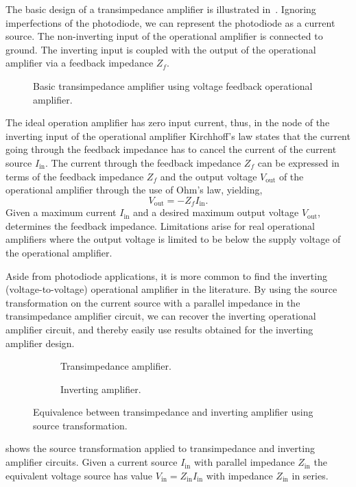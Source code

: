 The basic design of a transimpedance amplifier is illustrated in~.
Ignoring imperfections of the photodiode, we can represent the photodiode as a current source.
The non-inverting input of the operational amplifier is connected to ground.
The inverting input is coupled with the output of the operational amplifier via a feedback impedance $Z_f$.
\begin{figure}[H]
	\centering
	
	\caption{Basic transimpedance amplifier using voltage feedback operational amplifier.}\label{fig:basic_transimpedance}
\end{figure}
The ideal operation amplifier has zero input current, thus, in the node of the inverting input of the operational amplifier Kirchhoff's law states that the current going through the feedback impedance has to cancel the current of the current source $I_\text{in}$.
The current through the feedback impedance $Z_f$ can be expressed in terms of the feedback impedance $Z_f$ and the output voltage $V_\text{out}$ of the operational amplifier through the use of Ohm's law, yielding,
\begin{equation}
	V_\text{out}=-Z_fI_\text{in}
	\label{eq:transimpedance}.
\end{equation}
Given a maximum current $I_\text{in}$ and a desired maximum output voltage $V_\text{out}$,  determines the feedback impedance.
Limitations arise for real operational amplifiers where the output voltage is limited to be below the supply voltage of the operational amplifier.


Aside from photodiode applications, it is more common to find the inverting (voltage-to-voltage) operational amplifier in the literature.
By using the source transformation on the current source with a parallel impedance in the transimpedance amplifier circuit, we can recover the inverting operational amplifier circuit, and thereby easily use results obtained for the inverting amplifier design.
\begin{figure}[H]
	\begin{subfigure}[t]{.5\textwidth}
		\centering
		
		\caption{Transimpedance amplifier.}
	\end{subfigure}
	\begin{subfigure}[t]{.5\textwidth}
		\centering
		
		\caption{Inverting amplifier.}
	\end{subfigure}
	\caption{Equivalence between transimpedance and inverting amplifier using source transformation.}\label{fig:equivalence_transimpedance_inverting}
\end{figure}
 shows the source transformation applied to transimpedance and inverting amplifier circuits.
Given a current source $I_\text{in}$ with parallel impedance $Z_\text{in}$ the equivalent voltage source has value $V_\text{in}=Z_\text{in}I_\text{in}$ with impedance $Z_\text{in}$ in series.

